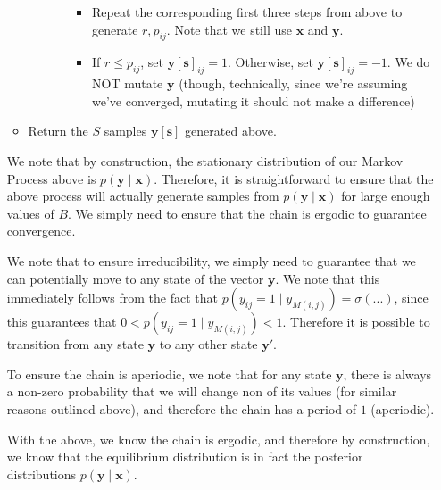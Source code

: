 \documentclass[12pt]{article}
\newcommand{\vect}[1]{\boldsymbol{#1}}
\begin{document}
\begin{enumerate}[label=(\alph*)]
\begin{itemize}
\begin{itemize}
\begin{itemize}
\begin{itemize}
				 				\item Repeat the corresponding first three steps from above to generate $r, p_{ij}$. Note that we still use $\vect{x}$ and $\vect{y}$.
				 				\item If $r \leq p_{ij}$, set $\vect{y[s]}_{ij} = 1$. Otherwise, set $\vect{y[s]}_{ij} = -1$. We do NOT mutate $\vect{y}$ (though, technically, since we're assuming we've converged, mutating it should not make a difference)
				 			\end{itemize}
				 	\end{itemize}
			\end{itemize}
		\item Return the $S$ samples $\vect{y[s]}$ generated above.
	\end{itemize}

	We note that by construction, the stationary distribution of our Markov Process above is $p(\vect{y} \mid \vect{x})$. Therefore, it is straightforward to ensure that the above process will actually generate samples from $p(\vect{y} \mid \vect{x})$ for large enough values of $B$. We simply need to ensure that the chain is ergodic to guarantee convergence.

	We note that to ensure irreducibility, we simply need to guarantee that we can potentially move to any state of the vector $\vect{y}$. We note that this immediately follows from the fact that $p(y_{ij} = 1 \mid y_{M(i,j)}) = \sigma(...)$, since this guarantees that $0 < p(y_{ij} = 1 \mid y_{M(i,j)}) < 1$. Therefore it is possible to transition from any state $\vect{y}$ to any other state $\vect{y}'$.

	To ensure the chain is aperiodic, we note that for any state $\vect{y}$, there is always a non-zero probability that we will change non of its values (for similar reasons outlined above), and therefore the chain has a period of $1$ (aperiodic).

	With the above, we know the chain is ergodic, and therefore by construction, we know that the equilibrium distribution is in fact the posterior distributions $p(\vect{y} \mid \vect{x})$.
\end{enumerate}
\end{document}
